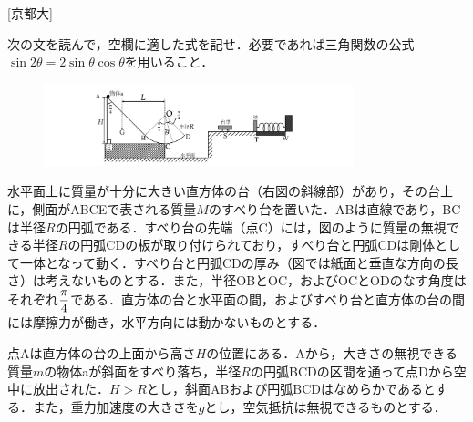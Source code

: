 

\noindent{} [京都大]

次の文を読んで，空欄に適した式を記せ．必要であれば三角関数の公式$\sin 2\theta = 2 \sin \theta \cos \theta$を用いること．

\begin{figure}
  \centering
  \includegraphics[width=9cm]{fig/fig_1_3.pdf}
\end{figure}
水平面上に質量が十分に大きい直方体の台（右図の斜線部）があり，その台上に，側面がABCEで表される質量$M$のすべり台を置いた．ABは直線であり，BCは半径$R$の円弧である．すべり台の先端（点C）には，図のように質量の無視できる半径$R$の円弧CDの板が取り付けられており，すべり台と円弧CDは剛体として一体となって動く．すべり台と円弧CDの厚み（図では紙面と垂直な方向の長さ）は考えないものとする．また，半径OBとOC，およびOCとODのなす角度はそれぞれ$\displaystyle\frac{\pi}{4}$である．直方体の台と水平面の間，およびすべり台と直方体の台の間には摩擦力が働き，水平方向には動かないものとする．

 点Aは直方体の台の上面から高さ$H$の位置にある．Aから，大きさの無視できる質量$m$の物体aが斜面をすべり落ち，半径$R$の円弧BCDの区間を通って点Dから空中に放出された．$H > R$とし，斜面ABおよび円弧BCDはなめらかであるとする．また，重力加速度の大きさを$g$とし，空気抵抗は無視できるものとする．

